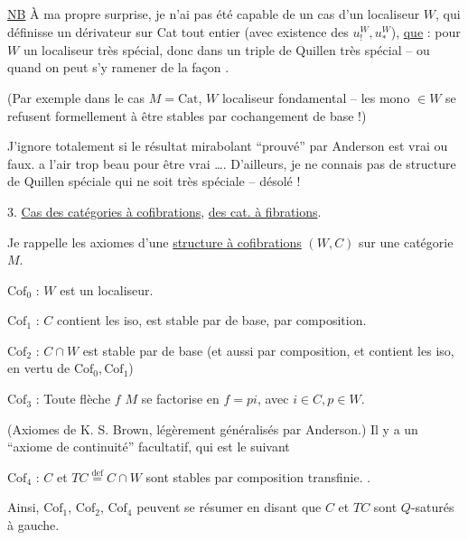 \uline{NB} À ma propre surprise, je n'ai pas été capable
de  un cas d'un localiseur $W$,
qui définisse un dérivateur sur Cat tout
entier (avec existence des $u_!^W,u_*^W$),
\uline{que} : pour $W$ un localiseur très spécial,
donc  dans \unsure{:} un triple de
Quillen très spécial -- ou quand on
peut s'y ramener de la façon .

(Par exemple dans le cas  $M=\mathrm{Cat}$, $W$
localiseur fondamental  -- les
mono $\in W$ se refusent formellement à
être stables par cochangement de base !)


J'ignore totalement si le résultat mirabolant
``prouvé'' par Anderson est vrai ou faux.  a l'air
 trop beau pour être vrai \ldots. D'ailleurs, je ne
connais pas de structure de Quillen spéciale qui
ne soit très spéciale -- désolé !

3. \uline{Cas des catégories à cofibrations}, \uline{des cat. à fibrations}.

Je rappelle les axiomes d'une \uline{structure à cofibrations}
$(W,C)$ sur une catégorie $M$.

$\mathrm{Cof}_0$ : $W$ est un localiseur.

$\mathrm{Cof}_1$ : $C$ contient les iso, est stable par 
de base, par composition.

$\mathrm{Cof}_2$ : $C\cap W$ est stable par  de base
(et aussi par composition, et contient les
iso, en vertu de $\mathrm{Cof}_0,\mathrm{Cof}_1$)

$\mathrm{Cof}_3$ : Toute flèche $f$  $M$ se factorise en
$f=pi$, avec $i\in C,p\in W$.

(Axiomes de K. S. Brown, légèrement généralisés
par Anderson.) Il y a un ``axiome de
continuité''  facultatif, qui est le suivant

$\mathrm{Cof}_4$ : 
$C$ et $TC\overset{\mathrm{def}}{=}C\cap W$ sont stables par
composition transfinie. .

Ainsi, $\mathrm{Cof}_1$, $\mathrm{Cof}_2$, $\mathrm{Cof}_4$ peuvent se résumer
en disant que $C$ et $TC$ sont $Q$-saturés
 à gauche.


